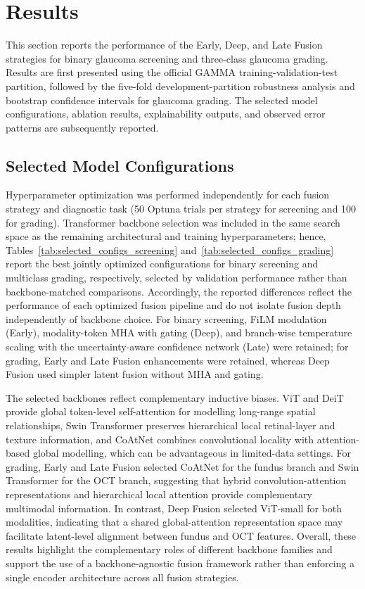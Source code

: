 \documentclass[sn-mathphys]{sn-jnl}%
\theoremstyle{thmstyleone}%
\theoremstyle{thmstyletwo}%
\theoremstyle{thmstylethree}%
\begin{document}
\section{Results}
\label{sec:results}

This section reports the performance of the Early, Deep, and Late Fusion strategies for binary glaucoma screening and three-class glaucoma grading. Results are first presented using the official GAMMA training-validation-test partition, followed by the five-fold development-partition robustness analysis and bootstrap confidence intervals for glaucoma grading. The selected model configurations, ablation results, explainability outputs, and observed error patterns are subsequently reported.

\subsection{Selected Model Configurations}
\label{subsec:selected_configurations}

Hyperparameter optimization was performed independently for each fusion strategy and diagnostic task (50 Optuna trials per strategy for screening and 100 for grading). Transformer backbone selection was included in the same search space as the remaining architectural and training hyperparameters; hence, Tables~\ref{tab:selected_configs_screening} and~\ref{tab:selected_configs_grading} report the best jointly optimized configurations for binary screening and multiclass grading, respectively, selected by validation performance rather than backbone-matched comparisons. Accordingly, the reported differences reflect the performance of each optimized fusion pipeline and do not isolate fusion depth independently of backbone choice.
For binary screening, FiLM modulation (Early), modality-token MHA with gating (Deep), and branch-wise temperature scaling with the uncertainty-aware confidence network (Late) were retained; for grading, Early and Late Fusion enhancements were retained, whereas Deep Fusion used simpler latent fusion without MHA and gating.

The selected backbones reflect complementary inductive biases. ViT and DeiT provide global token-level self-attention for modelling long-range spatial relationships, Swin Transformer preserves hierarchical local retinal-layer and texture information, and CoAtNet combines convolutional locality with attention-based global modelling, which can be advantageous in limited-data settings. For grading, Early and Late Fusion selected CoAtNet for the fundus branch and Swin Transformer for the OCT branch, suggesting that hybrid convolution-attention representations and hierarchical local attention provide complementary multimodal information. In contrast, Deep Fusion selected ViT-small for both modalities, indicating that a shared global-attention representation space may facilitate latent-level alignment between fundus and OCT features. Overall, these results highlight the complementary roles of different backbone families and support the use of a backbone-agnostic fusion framework rather than enforcing a single encoder architecture across all fusion strategies.
\end{document}
